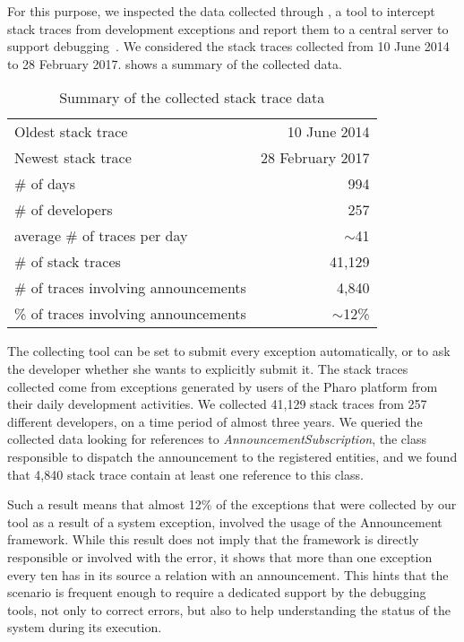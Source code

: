 For this purpose, we inspected the data collected through \sln, a tool to intercept stack traces from development exceptions and report them to a central server to support debugging~\cite{DalS2015a}.
We considered the stack traces collected from 10 June 2014 to 28 February 2017.  shows a summary of the collected data.

\begin{table}[h]
\centering
\caption{Summary of the collected stack trace data}
\begin{tabular}{lr}
\hline
Oldest stack trace & 10 June 2014 \\
Newest stack trace & 28 February 2017 \\
\# of days & 994\\
\# of developers & 257\\
average \# of traces per day & $\sim$41\\
\# of stack traces & 41,129 \\
\# of traces involving announcements & 4,840 \\
\% of traces involving announcements & $\sim$12\% \\
\hline
\end{tabular}
\label{tab:stack-traces}
\end{table}


The collecting tool can be set to submit every exception automatically, or to ask the developer whether she wants to explicitly submit it.
The stack traces collected come from exceptions generated by users of the Pharo platform from their daily development activities.
We collected 41,129 stack traces from 257 different developers, on a time period of almost three years.
We queried the collected data looking for references to \textit{AnnouncementSubscription}, the class responsible to dispatch the announcement to the registered entities, and we found that 4,840 stack trace contain at least one reference to this class.

Such a result means that almost 12\% of the exceptions that were collected by our tool as a result of a system exception, involved the usage of the Announcement framework.
While this result does not imply that the framework is directly responsible or involved with the error, it shows that more than one exception every ten has in its source a relation with an announcement.
This hints that the scenario is frequent enough to require a dedicated support by the debugging tools, not only to correct errors, but also to help understanding the status of the system during its execution.

